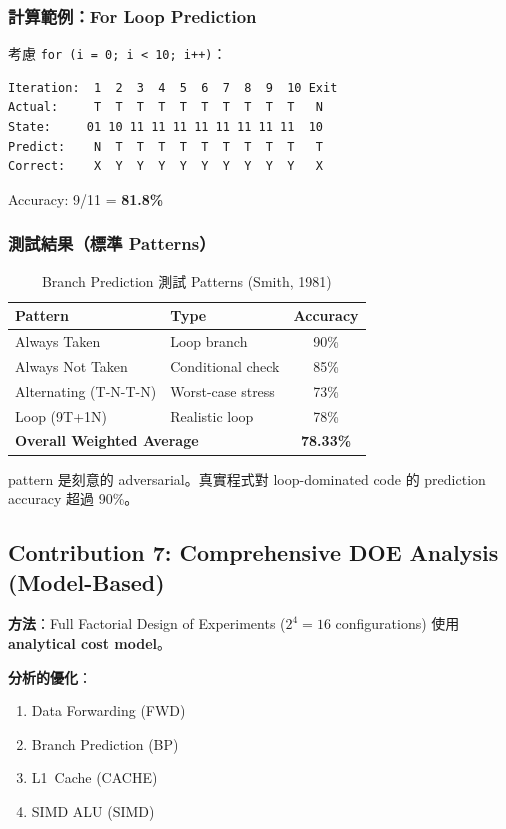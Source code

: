 \documentclass[journal]{IEEEtran}
\begin{document}
\subsubsection{計算範例：For Loop Prediction}
考慮 \texttt{for (i = 0; i < 10; i++)}：
\begin{lstlisting}
Iteration:  1  2  3  4  5  6  7  8  9  10 Exit
Actual:     T  T  T  T  T  T  T  T  T  T   N
State:     01 10 11 11 11 11 11 11 11 11  10
Predict:    N  T  T  T  T  T  T  T  T  T   T
Correct:    X  Y  Y  Y  Y  Y  Y  Y  Y  Y   X
\end{lstlisting}
Accuracy: 9/11 = \textbf{81.8\%}

\subsubsection{測試結果（標準 Patterns）}
\begin{table}[!t]
\centering
\caption{Branch Prediction 測試 Patterns (Smith, 1981)}
\footnotesize
\begin{tabular}{@{}llc@{}}
\toprule
\textbf{Pattern} & \textbf{Type} & \textbf{Accuracy} \\
\midrule
Always Taken & Loop branch & 90\% \\
Always Not Taken & Conditional check & 85\% \\
Alternating (T-N-T-N) & Worst-case stress & 73\% \\
Loop (9T+1N) & Realistic loop & 78\% \\
\midrule
\multicolumn{2}{l}{\textbf{Overall Weighted Average}} & \textbf{78.33\%} \\
\bottomrule
\end{tabular}
\end{table}

\Notealternating pattern 是刻意的 adversarial。真實程式對 loop-dominated code 的 prediction accuracy 超過 90\%。



\subsection{Contribution 7: Comprehensive DOE Analysis (Model-Based)}



\textbf{方法}：Full Factorial Design of Experiments ($2^{4}=16$ configurations) 使用 \textbf{analytical cost model}。

\textbf{分析的優化}：
\begin{enumerate}
    \item Data Forwarding (FWD)
    \item Branch Prediction (BP)
    \item L1~Cache (CACHE)
    \item SIMD ALU (SIMD)
\end{enumerate}
\end{document}
